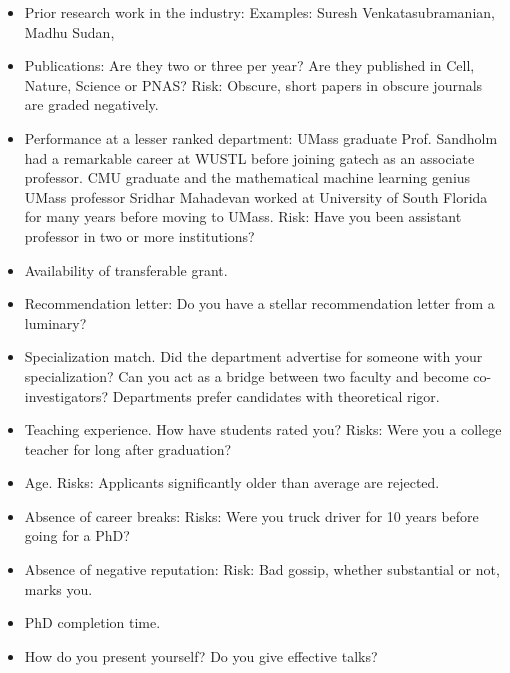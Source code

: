 \documentclass[oneside, article]{memoir}
\begin{document}
\begin{itemize}
\item Prior research work in the industry: Examples: Suresh Venkatasubramanian, Madhu Sudan,

\item Publications:
\subitem Are they two or three per year? Are they published in Cell, Nature, Science or PNAS?
\subitem Risk:
\subsubitem Obscure, short papers in obscure journals are graded negatively.

\item Performance at a lesser ranked department:
\subitem UMass graduate Prof. Sandholm had a remarkable career at WUSTL before joining gatech as an associate professor.
\subitem CMU graduate and the mathematical machine learning genius UMass professor Sridhar Mahadevan worked at University of South Florida for many years before moving to UMass.
\subitem Risk:
\subsubitem Have you been assistant professor in two or more institutions?

\item Availability of transferable grant.

\item Recommendation letter:
Do you have a stellar recommendation letter from a luminary?

\item Specialization match.
\subitem Did the department advertise for someone with your specialization?
\subitem Can you act as a bridge between two faculty and become co-investigators?
\subitem Departments prefer candidates with theoretical rigor.

\item Teaching experience.
\subitem How have students rated you?
\subitem Risks: Were you a college teacher for long after graduation?

\item Age.
\subitem Risks:
\subsubitem Applicants significantly older than average are rejected.
\item Absence of career breaks:
\subitem Risks:
\subsubitem Were you truck driver for 10 years before going for a PhD?

\item Absence of negative reputation:
\subitem Risk:
\subsubitem Bad gossip, whether substantial or not, marks you.

\item PhD completion time.

\item How do you present yourself?
\subitem Do you give effective talks?


\end{itemize}
\end{document}
